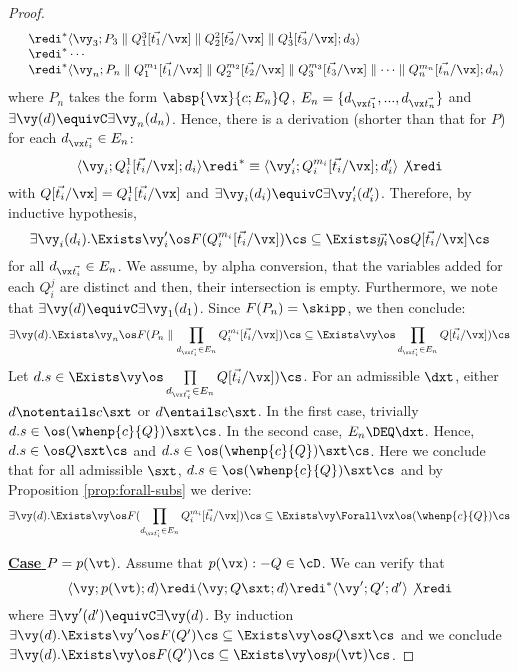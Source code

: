 \documentclass{tlp}
\begin{document}
\begin{proof}
\[\begin{array}{ll}
 & \redi^*   \langle \vy_3 ; P_3 \parallel Q_1^3[\vec{t_1}/\vx] \parallel Q_2^2[\vec{t_2}/\vx] \parallel Q_3^1[\vec{t_3}/\vx] ; d_3\rangle \\
  & \redi^*  \cdots \\
 & \redi^*   \langle \vy_n; P_n \parallel Q_1^{m_1}[\vec{t_1}/\vx] \parallel Q_2^{m_2}[\vec{t_2}/\vx] \parallel Q_3^{m_3}[\vec{t_3}/\vx] \parallel \cdots \parallel  Q_n^{m_n}[\vec{t_n}/\vx]; d_n\rangle 
 \end{array}
\]
where  $P_n$ takes the form 
$\absp{\vx}{c;E_n}Q$, $E_n=\{d_{\vx\vec{t_1}},...,d_{\vx\vec{t_n}}\}$ and $\exists \vy(d) \equivC \exists \vy_n (d_n)$. Hence, there is a  derivation (shorter than that for $P$) for each $d_{\vx\vec{t_i}} \in E_n$:
\[
\langle \vy_i;Q_i^1[\vec{t_i}/\vx];d_i\rangle \redi^*\equiv  
\langle\vy_i'; Q_i^{m_i}[\vec{t_i}/\vx];d_i'\rangle \not\redi
\]
with $Q[\vec{t_i}/\vx] = Q^1_i[\vec{t_i}/\vx]$ and 
$\exists \vy_i (d_i) \equivC \exists \vy_i'(d_i')$. 
Therefore, by  inductive hypothesis, 
\[\exists \vy_i(d_i).\Exists \vy_i' \os F(Q_i^{m_i}[\vec{t_i}/\vx]) \cs\subseteq \Exists \vec{y_i} \os Q[\vec{t_i}/\vx] \cs
\]
 for all $d_{\vx\vec{t_i}} \in E_n$. We assume, by alpha conversion,  that the variables added for each   $Q_i^j$ are distinct and then, their intersection is empty.   Furthermore, we note that $\exists \vy(d) \equivC \exists \vy_1 (d_1)$. Since  $F(P_n) = \skipp$, we then conclude: 
\[
\exists \vy(d).\Exists \vy_n \os F(P_n \parallel \prod\limits_{d_{\vx\vec{t_i}} \in E_n} Q_i^{m_i}[\vec{t_i}/\vx]) \cs \subseteq \Exists \vy \os\prod\limits_{d_{\vx\vec{t_i}} \in E_n} Q[\vec{t_i}/\vx])   \cs
\]
Let $d.s \in \Exists \vy \os\prod\limits_{d_{\vx\vec{t_i}} \in E_n} Q[\vec{t_i}/\vx])   \cs$. 
	  For an admissible 
	  $\dxt$, either $d \notentails c\sxt$ or $d\entails c\sxt$. In the first case, trivially 
	  $d.s \in \os (\whenp{c}{Q})\sxt\cs$. In the second case, 
	   $E_n  \DEQ \dxt $. Hence,   $d.s \in \os Q\sxt\cs $ and   $d.s \in \os(\whenp{c}{Q})\sxt \cs$. 
	   Here we conclude that for all admissible $\sxt$, $d.s \in \os (\whenp{c}{Q})\sxt\cs$ and by   Proposition \ref{prop:forall-subs} we derive:
	  \[
	  \exists \vy(d).\Exists \vy \os F(\prod\limits_{d_{\vx\vec{t_i}} \in E_n} Q_i^{m_i}[\vec{t_i}/\vx]) \cs \subseteq \Exists \vy \Forall \vx \os (\whenp{c}{Q})  \cs
	  \]

\noindent \underline{{\bf Case}  $P=p(\vt)$}. Assume that 
$p(\vx) :- Q \in  \cD$.    We can verify that 
\[
\langle\vy;  p(\vt); d\rangle \redi \langle \vy;Q\sxt ; d\rangle \redi^* \langle  \vy' ; Q'; d'\rangle \not\redi
\]
where $\exists \vy' (d') \equivC \exists \vy(d)$. 
By induction  $\exists \vy(d).\Exists \vy' \os F(Q')\cs \subseteq \Exists \vy \os Q\sxt  \cs$ and we conclude 
$\exists \vy(d).\Exists \vy \os F(Q')\cs \subseteq \Exists \vy \os p(\vt)\cs$. \end{proof}
\end{document}
